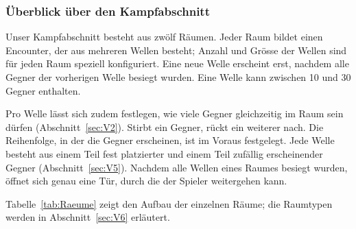 \documentclass[../Main.tex]{subfiles}
\begin{document}
\subsubsection{Überblick über den Kampfabschnitt} \label{sec:Kampfabschnitt}

Unser Kampfabschnitt besteht aus zwölf Räumen. Jeder Raum bildet einen Encounter, der aus mehreren Wellen besteht; Anzahl und Grösse der Wellen sind für jeden Raum speziell konfiguriert. Eine neue Welle erscheint erst, nachdem alle Gegner der vorherigen Welle besiegt wurden. Eine Welle kann zwischen 10 und 30 Gegner enthalten.

Pro Welle lässt sich zudem festlegen, wie viele Gegner gleichzeitig im Raum sein dürfen (Abschnitt~\ref{sec:V2}). Stirbt ein Gegner, rückt ein weiterer nach. Die Reihenfolge, in der die Gegner erscheinen, ist im Voraus festgelegt. Jede Welle besteht aus einem Teil fest platzierter und einem Teil zufällig erscheinender Gegner (Abschnitt~\ref{sec:V5}). Nachdem alle Wellen eines Raumes besiegt wurden, öffnet sich genau eine Tür, durch die der Spieler weitergehen kann.

Tabelle~\ref{tab:Raeume} zeigt den Aufbau der einzelnen Räume; die Raumtypen werden in Abschnitt~\ref{sec:V6} erläutert.
\end{document}
